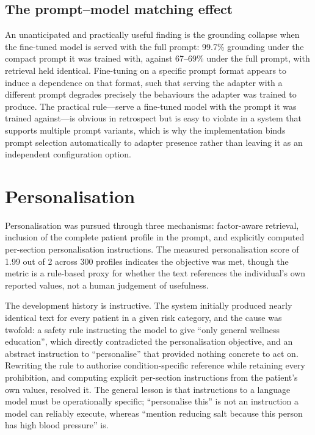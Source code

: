 \subsection{The prompt--model matching effect}

An unanticipated and practically useful finding is the grounding collapse when
the fine-tuned model is served with the full prompt: 99.7\% grounding under the
compact prompt it was trained with, against 67--69\% under the full prompt, with
retrieval held identical. Fine-tuning on a specific prompt format appears to
induce a dependence on that format, such that serving the adapter with a
different prompt degrades precisely the behaviours the adapter was trained to
produce. The practical rule---serve a fine-tuned model with the prompt it was
trained against---is obvious in retrospect but is easy to violate in a system
that supports multiple prompt variants, which is why the implementation binds
prompt selection automatically to adapter presence rather than leaving it as an
independent configuration option.

\section{Personalisation}
\label{sec:disc_personal}

Personalisation was pursued through three mechanisms: factor-aware retrieval,
inclusion of the complete patient profile in the prompt, and explicitly computed
per-section personalisation instructions. The measured personalisation score of
1.99 out of 2 across 300 profiles indicates the objective was met, though the
metric is a rule-based proxy for whether the text references the individual's
own reported values, not a human judgement of usefulness.

The development history is instructive. The system initially produced nearly
identical text for every patient in a given risk category, and the cause was
twofold: a safety rule instructing the model to give ``only general wellness
education'', which directly contradicted the personalisation objective, and an
abstract instruction to ``personalise'' that provided nothing concrete to act
on. Rewriting the rule to authorise condition-specific reference while retaining
every prohibition, and computing explicit per-section instructions from the
patient's own values, resolved it. The general lesson is that instructions to a
language model must be operationally specific; ``personalise this'' is not an
instruction a model can reliably execute, whereas ``mention reducing salt because
this person has high blood pressure'' is.


